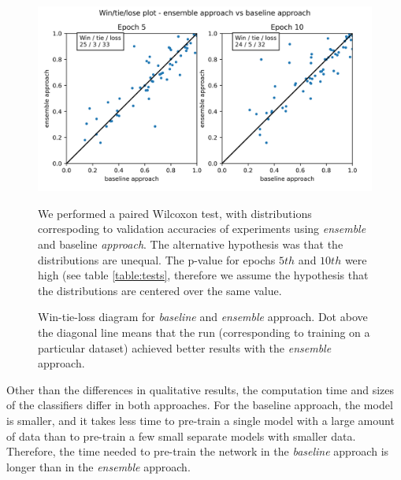 \documentclass[a4paper,11pt,twoside]{report}
\theoremstyle{definition}
\begin{document}
\FloatBarrier
\begin{figure}[h!t]
\centering
\includegraphics[width=17cm]{imgs/baseline_vs_ensemble/win_tie_lose_epoch.png}
\caption{Win-tie-loss diagram  for\textit{ baseline } and\textit{ ensemble }approach. Dot above the diagonal line means that the run (corresponding to training on a particular dataset)  achieved better results with the \textit{ensemble} approach.}
We performed a paired Wilcoxon test, with distributions correspoding to  validation accuracies of experiments using \textit{ensemble} and baseline \textit{approach}. The alternative hypothesis was that the distributions are unequal. The p-value for epochs $5th$ and $10th$ were high (see table \ref{table:tests}, therefore we assume the hypothesis that the distributions are centered over the same value.
\label{fig:win_tie_loss_baseline_vs_ensemble}
\end{figure}
\FloatBarrier

Other than the differences in qualitative results, the computation time and sizes of the classifiers differ in both approaches.
For the baseline approach, the model is smaller, and it takes less time to pre-train a single model with a large amount of data than to pre-train a few small separate models with smaller data. Therefore, the time needed to pre-train the network in the \textit{baseline} approach is longer than in the \textit{ensemble} approach.
\end{document}
